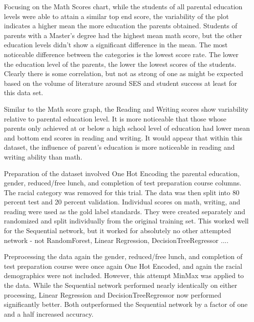 \documentclass[man,12pt]{apa6} %
\begin{document}
Focusing on the Math Scores chart, while the students of all parental education levels were able to attain a similar top end score, the variability of the plot indicates a higher mean the more education the parents obtained.  Students of parents with a Master's degree had the highest mean math score, but the other education levels didn't show a significant difference in the mean.  The most noticeable difference between the categories is the lowest score rate. The lower the education level of the parents, the lower the lowest scores of the students.  Clearly there is some correlation, but not as strong of one as might be expected based on the volume of literature around SES and student success at least for this data set.

Similar to the Math score graph, the Reading and Writing scores show variability relative to parental education level.  It is more noticeable that those whose parents only achieved at or below a high school level of education had lower mean and bottom end scores in reading and writing. It would appear that within this dataset, the influence of parent's education is more noticeable in reading and writing ability than math.

Preparation of the dataset involved One Hot Encoding the parental education, gender, reduced/free lunch, and completion of test preparation course columns. The racial category was removed for this trial. The data was then split into 80 percent test and 20 percent validation.  Individual scores on math, writing, and reading were used as the gold label standards. They were created separately and randomized and split individually from the original training set. This worked well for the Sequential network, but it worked for absolutely no other attempted network - not RandomForest, Linear Regression, DecisionTreeRegressor ....

Preprocessing the data again the gender, reduced/free lunch, and completion of test preparation course were once again One Hot Encoded, and again the racial demographics were not included. However, this attempt MinMax was applied to the data. While the Sequential network performed nearly identically on either processing, Linear Regression and DecisionTreeRegressor now performed significantly better.  Both outperformed the Sequential network by a factor of one and a half increased accuracy.
\end{document}
